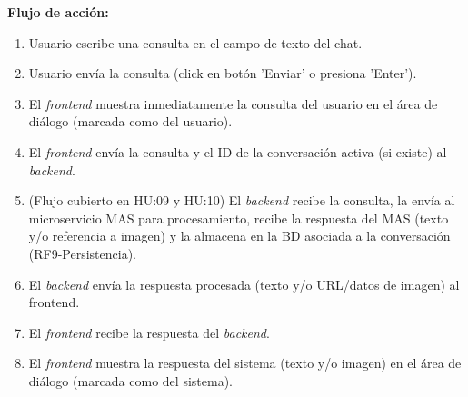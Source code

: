\begin{userstory}[hu:08]
{		\textbf{Flujo de acción:}
		\begin{enumerate}
			\item Usuario escribe una consulta en el campo de texto del chat.
			\item Usuario envía la consulta (click en botón 'Enviar' o presiona 'Enter').
			\item El \textit{frontend} muestra inmediatamente la consulta del usuario en el área de diálogo (marcada como del usuario).
			\item El \textit{frontend} envía la consulta y el ID de la conversación activa (si existe) al \textit{backend}.
			\item (Flujo cubierto en HU:09 y HU:10) El \textit{backend} recibe la consulta, la envía al microservicio MAS para procesamiento, recibe la respuesta del MAS (texto y/o referencia a imagen) y la almacena en la BD asociada a la conversación (RF9-Persistencia).
			\item El \textit{backend} envía la respuesta procesada (texto y/o URL/datos de imagen) al frontend.
			\item El \textit{frontend} recibe la respuesta del \textit{backend}.
			\item El \textit{frontend} muestra la respuesta del sistema (texto y/o imagen) en el área de diálogo (marcada como del sistema).
		\end{enumerate}
	}
	
\end{userstory}

